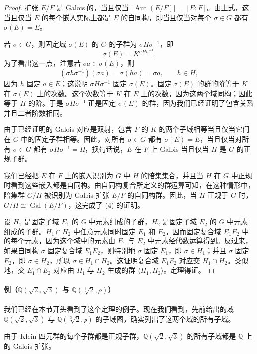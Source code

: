 \begin{proof}
扩张 $E/F$ 是 Galois 的，当且仅当 $|\operatorname{Aut}(E/F)|=[E:F]$。由上式，这当且仅当 $E$ 的每个嵌入实际上都是 $E$ 的自同构，即当且仅当对每个 $\sigma\in G$ 都有 $\sigma(E)=E$。

若 $\sigma\in G$，则固定域 $\sigma(E)$ 的 $G$ 的子群为 $\sigma H\sigma^{-1}$，即
\[
\sigma(E)=K^{\sigma H\sigma^{-1}}.
\]
为了看出这一点，注意若 $\sigma a\in\sigma(E)$，则
\[
(\sigma h\sigma^{-1})(\sigma a)=\sigma(ha)=\sigma a,
\qquad h\in H,
\]
因为 $h$ 固定 $a\in E$；这说明 $\sigma H\sigma^{-1}$ 固定 $\sigma(E)$。固定 $\sigma(E)$ 的群的阶等于 $K$ 在 $\sigma(E)$ 上的次数。这个次数等于 $K$ 在 $E$ 上的次数，因为这两个域同构；因此等于 $H$ 的阶。于是 $\sigma H\sigma^{-1}$ 正是固定 $\sigma(E)$ 的群，因为我们已经证明了包含关系并且二者阶数相同。

由于已经证明的 Galois 对应是双射，包含 $F$ 的 $K$ 的两个子域相等当且仅当它们在 $G$ 中的固定子群相等。因此，对所有 $\sigma\in G$ 都有 $\sigma(E)=E$，当且仅当对所有 $\sigma\in G$ 都有 $\sigma H\sigma^{-1}=H$，换句话说，$E$ 在 $F$ 上 Galois 当且仅当 $H$ 是 $G$ 的正规子群。

我们已经把 $E$ 在 $F$ 上的嵌入识别为 $G$ 中 $H$ 的陪集集合，并且当 $H$ 在 $G$ 中正规时看到这些嵌入都是自同构。由自同构复合所定义的群运算可知，在这种情形中，陪集群 $G/H$ 被识别为 Galois 扩张 $E/F$ 的自同构群。因此，当 $H$ 正规于 $G$ 时，$G/H\cong\operatorname{Gal}(E/F)$，这完成了 (4) 的证明。

设 $H_1$ 是固定子域 $E_1$ 的 $G$ 中元素组成的子群，$H_2$ 是固定子域 $E_2$ 的 $G$ 中元素组成的子群。$H_1\cap H_2$ 中任意元素同时固定 $E_1$ 和 $E_2$，因而固定复合域 $E_1E_2$ 中的每个元素，因为这个域中的元素由 $E_1$ 与 $E_2$ 中元素经代数运算得到。反过来，如果自同构 $\sigma$ 固定复合域 $E_1E_2$，则特别地 $\sigma$ 固定 $E_1$，即 $\sigma\in H_1$；并且 $\sigma$ 固定 $E_2$，即 $\sigma\in H_2$，所以 $\sigma\in H_1\cap H_2$。这证明复合域 $E_1E_2$ 对应交 $H_1\cap H_2$。类似地，交 $E_1\cap E_2$ 对应由 $H_1$ 与 $H_2$ 生成的群 $\langle H_1,H_2\rangle$。定理得证。
\end{proof}

\paragraph{例（$\mathbb Q(\sqrt2,\sqrt3)$ 与 $\mathbb Q(\sqrt[3]{2},\rho)$）}
我们已经在本节开头看到了这个定理的例子。现在我们看到，先前给出的域 $\mathbb Q(\sqrt2,\sqrt3)$ 与 $\mathbb Q(\sqrt[3]{2},\rho)$ 的子域图，确实列出了这两个域的所有子域。

由于 Klein 四元群的每个子群都是正规子群，$\mathbb Q(\sqrt2,\sqrt3)$ 的所有子域都是 $\mathbb Q$ 上的 Galois 扩张。


